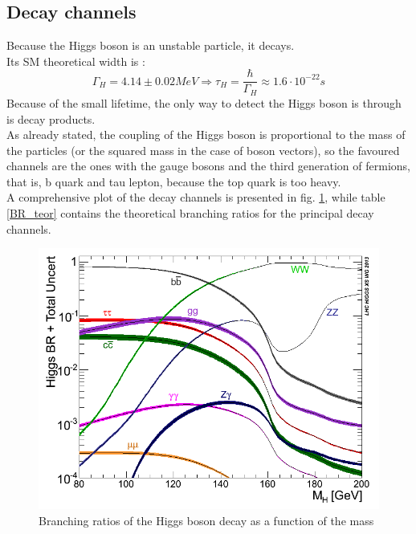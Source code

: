 \subsection{Decay channels}
Because the Higgs boson is an unstable particle, it decays.\\
Its SM theoretical width is \cite{higgs_width}:
\begin{equation}
    \Gamma_H = 4.14 \pm 0.02 MeV \Longrightarrow \tau_H = \frac{\hbar}{\Gamma_H} \approx 1.6 \cdot 10^{-22} s
\end{equation}
Because of the small lifetime, the only way to detect the Higgs boson is through is decay products.\\ 
As already stated, the coupling of the Higgs boson is proportional to the mass of the particles (or the squared mass in the case of boson vectors), so the favoured channels are the ones with the gauge bosons and the third generation of fermions, that is, b quark and tau lepton, because the top quark is too heavy.\\
A comprehensive plot of the decay channels is presented in fig. \ref{higgs_br}, while table \ref{BR_teor} contains the theoretical branching ratios for the principal decay channels.\\
\begin{figure}[ht]
    \centering
    \includegraphics[width = \textwidth]{images/br.png}
    \caption{Branching ratios of the Higgs boson decay as a function of the mass}
    \label{higgs_br}
\end{figure}
